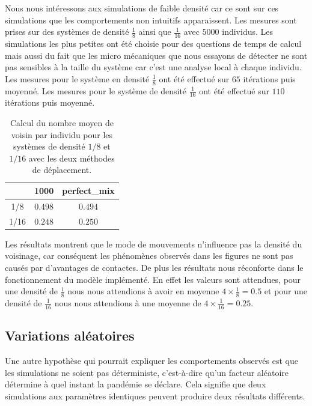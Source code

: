 Nous nous intéressons aux simulations de faible densité car ce sont sur ces simulations que les comportements non intuitifs apparaissent. Les mesures sont prises sur des systèmes de densité $\frac{1}{8}$ ainsi que $\frac{1}{16}$ avec $5000$ individus. Les simulations les plus petites ont été choisie pour des questions de temps de calcul mais aussi du fait que les micro mécaniques que nous essayons de détecter ne sont pas sensibles à la taille du système car c'est une analyse local à chaque individu.\\

Les mesures pour le système en densité $\frac{1}{8}$ ont été effectué sur $65$ itérations puis moyenné. Les mesures pour le système de densité $\frac{1}{16}$ ont été effectué sur $110$ itérations puis moyenné.

\begin{table}[H]
	\centering
	\captionsetup{justification=centering}
	\caption[Voisinage moyen : SI]{Calcul du nombre moyen de voisin par individu pour les systèmes de densité $1/8$ et $1/16$ avec les deux méthodes de déplacement.\label{tab:grid}}
	\begin{tabular}{@{\extracolsep{\fill} } c|| c| c|}
		     & 1000    & perfect\_mix \\
		\midrule
		\midrule
		1/8  & $0.498$ & $0.494$      \\
		\midrule
		1/16 & $0.248$ & $0.250$      \\
		\bottomrule
	\end{tabular}
\end{table}

Les résultats montrent que le mode de mouvements n'influence pas la densité du voisinage, car conséquent les phénomènes observés dans les figures ne sont pas causés par d'avantages de contactes. De plus les résultats nous réconforte dans le fonctionnement du modèle implémenté. En effet les valeurs sont attendues, pour une densité de $\frac{1}{8}$ nous nous attendions à avoir en moyenne $4\times \frac{1}{8} = 0.5$ et pour une densité de $\frac{1}{16}$ nous nous attendions à une moyenne de $4\times \frac{1}{16} = 0.25$.

\subsection{Variations aléatoires}

Une autre hypothèse qui pourrait expliquer les comportements observés est que les simulations ne soient pas déterministe, c'est-à-dire qu'un facteur aléatoire détermine à quel instant la pandémie se déclare. Cela signifie que deux simulations aux paramètres identiques peuvent produire deux résultats différents.\\

